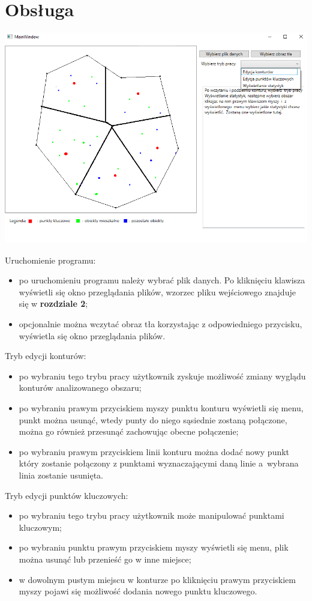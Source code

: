 \documentclass[a4paper,11pt]{article}
\begin{document}
\section{Obsługa}
\includegraphics[scale=0.75]{GUI_EXAMPLE.png}

\noindent
Uruchomienie programu:
\begin{itemize}
\item po uruchomieniu programu należy wybrać plik danych. Po kliknięciu klawisza wyświetli się okno przeglądania plików, wzorzec pliku wejściowego znajduje się w \textbf{rozdziale 2};
\item opcjonalnie można wczytać obraz tła korzystając z odpowiedniego przycisku, wyświetla się okno przeglądania plików.
\end{itemize}
Tryb edycji konturów:
\begin{itemize}
\item po wybraniu tego trybu pracy użytkownik zyskuje możliwość zmiany wyglądu konturów analizowanego obszaru;
\item po wybraniu prawym przyciskiem myszy punktu konturu wyświetli się menu, punkt można usunąć, wtedy punty do niego sąsiednie zostaną połączone, można go również przesunąć zachowując obecne połączenie;
\item po wybraniu prawym przyciskiem linii konturu można dodać nowy punkt który zostanie połączony z punktami wyznaczającymi daną linie a~wybrana linia zostanie usunięta.
\end{itemize}
Tryb edycji punktów kluczowych:
\begin{itemize}
\item po wybraniu tego trybu pracy użytkownik może manipulować punktami kluczowym;
\item po wybraniu punktu prawym przyciskiem myszy wyświetli się menu, plik można usunąć lub przenieść go w inne miejsce;
\item w dowolnym pustym miejscu w konturze po kliknięciu prawym przyciskiem myszy pojawi się możliwość dodania nowego punktu kluczowego.
\end{itemize}
\end{document}
